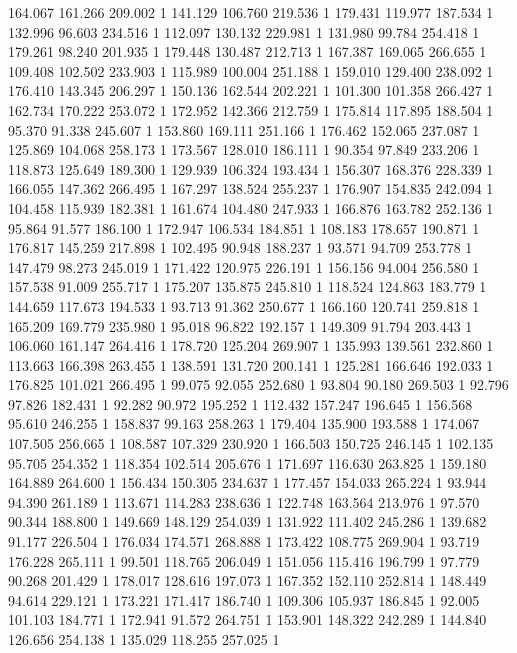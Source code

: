 	164.067	161.266	209.002	1
	141.129	106.760	219.536	1
	179.431	119.977	187.534	1
	132.996	96.603	234.516	1
	112.097	130.132	229.981	1
	131.980	99.784	254.418	1
	179.261	98.240	201.935	1
	179.448	130.487	212.713	1
	167.387	169.065	266.655	1
	109.408	102.502	233.903	1
	115.989	100.004	251.188	1
	159.010	129.400	238.092	1
	176.410	143.345	206.297	1
	150.136	162.544	202.221	1
	101.300	101.358	266.427	1
	162.734	170.222	253.072	1
	172.952	142.366	212.759	1
	175.814	117.895	188.504	1
	95.370	91.338	245.607	1
	153.860	169.111	251.166	1
	176.462	152.065	237.087	1
	125.869	104.068	258.173	1
	173.567	128.010	186.111	1
	90.354	97.849	233.206	1
	118.873	125.649	189.300	1
	129.939	106.324	193.434	1
	156.307	168.376	228.339	1
	166.055	147.362	266.495	1
	167.297	138.524	255.237	1
	176.907	154.835	242.094	1
	104.458	115.939	182.381	1
	161.674	104.480	247.933	1
	166.876	163.782	252.136	1
	95.864	91.577	186.100	1
	172.947	106.534	184.851	1
	108.183	178.657	190.871	1
	176.817	145.259	217.898	1
	102.495	90.948	188.237	1
	93.571	94.709	253.778	1
	147.479	98.273	245.019	1
	171.422	120.975	226.191	1
	156.156	94.004	256.580	1
	157.538	91.009	255.717	1
	175.207	135.875	245.810	1
	118.524	124.863	183.779	1
	144.659	117.673	194.533	1
	93.713	91.362	250.677	1
	166.160	120.741	259.818	1
	165.209	169.779	235.980	1
	95.018	96.822	192.157	1
	149.309	91.794	203.443	1
	106.060	161.147	264.416	1
	178.720	125.204	269.907	1
	135.993	139.561	232.860	1
	113.663	166.398	263.455	1
	138.591	131.720	200.141	1
	125.281	166.646	192.033	1
	176.825	101.021	266.495	1
	99.075	92.055	252.680	1
	93.804	90.180	269.503	1
	92.796	97.826	182.431	1
	92.282	90.972	195.252	1
	112.432	157.247	196.645	1
	156.568	95.610	246.255	1
	158.837	99.163	258.263	1
	179.404	135.900	193.588	1
	174.067	107.505	256.665	1
	108.587	107.329	230.920	1
	166.503	150.725	246.145	1
	102.135	95.705	254.352	1
	118.354	102.514	205.676	1
	171.697	116.630	263.825	1
	159.180	164.889	264.600	1
	156.434	150.305	234.637	1
	177.457	154.033	265.224	1
	93.944	94.390	261.189	1
	113.671	114.283	238.636	1
	122.748	163.564	213.976	1
	97.570	90.344	188.800	1
	149.669	148.129	254.039	1
	131.922	111.402	245.286	1
	139.682	91.177	226.504	1
	176.034	174.571	268.888	1
	173.422	108.775	269.904	1
	93.719	176.228	265.111	1
	99.501	118.765	206.049	1
	151.056	115.416	196.799	1
	97.779	90.268	201.429	1
	178.017	128.616	197.073	1
	167.352	152.110	252.814	1
	148.449	94.614	229.121	1
	173.221	171.417	186.740	1
	109.306	105.937	186.845	1
	92.005	101.103	184.771	1
	172.941	91.572	264.751	1
	153.901	148.322	242.289	1
	144.840	126.656	254.138	1
	135.029	118.255	257.025	1
